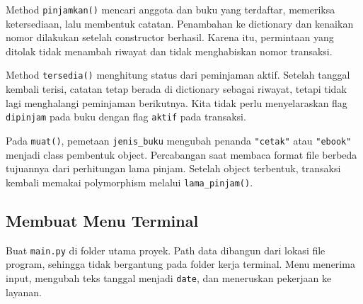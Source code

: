 Method \texttt{pinjamkan()} mencari anggota dan buku yang terdaftar, memeriksa ketersediaan, lalu membentuk catatan. Penambahan ke dictionary dan kenaikan nomor dilakukan setelah constructor berhasil. Karena itu, permintaan yang ditolak tidak menambah riwayat dan tidak menghabiskan nomor transaksi.

Method \texttt{tersedia()} menghitung status dari peminjaman aktif. Setelah tanggal kembali terisi, catatan tetap berada di dictionary sebagai riwayat, tetapi tidak lagi menghalangi peminjaman berikutnya. Kita tidak perlu menyelaraskan flag \texttt{dipinjam} pada buku dengan flag \texttt{aktif} pada transaksi.

Pada \texttt{muat()}, pemetaan \texttt{jenis\_buku} mengubah penanda \texttt{"cetak"} atau \texttt{"ebook"} menjadi class pembentuk object. Percabangan saat membaca format file berbeda tujuannya dari perhitungan lama pinjam. Setelah object terbentuk, transaksi kembali memakai polymorphism melalui \texttt{lama\_pinjam()}.

\subsection{Membuat Menu Terminal}

Buat \texttt{main.py} di folder utama proyek. Path data dibangun dari lokasi file program, sehingga tidak bergantung pada folder kerja terminal. Menu menerima input, mengubah teks tanggal menjadi \texttt{date}, dan meneruskan pekerjaan ke layanan.


